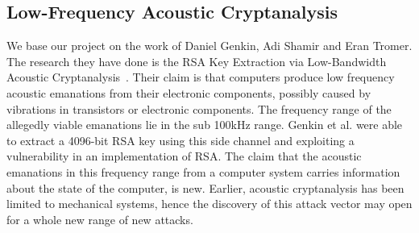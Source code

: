 \subsection{Low-Frequency Acoustic Cryptanalysis}\label{chp2:subsec:original_research}
We base our project on the work of Daniel Genkin, Adi Shamir and Eran Tromer.
The research they have done is the RSA Key Extraction via Low-Bandwidth Acoustic Cryptanalysis~\cite{DBLP:conf/crypto/GenkinST14}.
Their claim is that computers produce low frequency acoustic emanations from their electronic components, possibly caused by vibrations in transistors or electronic components.
The frequency range of the allegedly viable emanations lie in the sub 100kHz range.
Genkin et al. were able to extract a 4096-bit RSA key using this side channel and exploiting a vulnerability in an implementation of RSA.
The claim that the acoustic emanations in this frequency range from a computer system carries information about the state of the computer, is new.
Earlier, acoustic cryptanalysis has been limited to mechanical systems, hence the discovery of this attack vector may open for a whole new range of new attacks.
